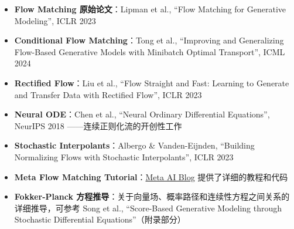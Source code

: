 \begin{itemize}
    \item \textbf{Flow Matching 原始论文}：Lipman et al., ``Flow Matching for Generative Modeling'', ICLR 2023
    \item \textbf{Conditional Flow Matching}：Tong et al., ``Improving and Generalizing Flow-Based Generative Models with Minibatch Optimal Transport'', ICML 2024
    \item \textbf{Rectified Flow}：Liu et al., ``Flow Straight and Fast: Learning to Generate and Transfer Data with Rectified Flow'', ICLR 2023
    \item \textbf{Neural ODE}：Chen et al., ``Neural Ordinary Differential Equations'', NeurIPS 2018 ——连续正则化流的开创性工作
    \item \textbf{Stochastic Interpolants}：Albergo \& Vanden-Eijnden, ``Building Normalizing Flows with Stochastic Interpolants'', ICLR 2023
    \item \textbf{Meta Flow Matching Tutorial}：\href{https://ai.meta.com/blog/flow-matching-guide-generative-ai/}{Meta AI Blog} 提供了详细的教程和代码
    \item \textbf{Fokker-Planck 方程推导}：关于向量场、概率路径和连续性方程之间关系的详细推导，可参考 Song et al., ``Score-Based Generative Modeling through Stochastic Differential Equations''（附录部分）
\end{itemize}




